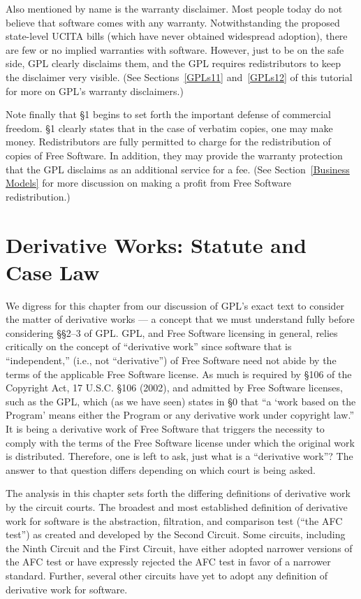 \documentclass[11pt, letterpaper]{book}
\begin{document}
Also mentioned by name is the warranty disclaimer. Most people today do
not believe that software comes with any warranty. Notwithstanding the
proposed state-level UCITA bills (which have never obtained widespread
adoption), there are few or no implied warranties with software.
However, just to be on the safe side, GPL clearly disclaims them, and the
GPL requires redistributors to keep the disclaimer very visible. (See
Sections~\ref{GPLs11} and~\ref{GPLs12} of this tutorial for more on GPL's
warranty disclaimers.)

Note finally that \S 1 begins to set forth the important defense of
commercial freedom. \S 1 clearly states that in the case of verbatim
copies, one may make money. Redistributors are fully permitted to charge
for the redistribution of copies of Free Software. In addition, they may
provide the warranty protection that the GPL disclaims as an additional
service for a fee. (See Section~\ref{Business Models} for more discussion
on making a profit from Free Software redistribution.)


\chapter{Derivative Works: Statute and Case Law}

We digress for this chapter from our discussion of GPL's exact text to
consider the matter of derivative works --- a concept that we must
understand fully before considering \S\S 2--3 of GPL\@. GPL, and Free
Software licensing in general, relies critically on the concept of
``derivative work'' since software that is ``independent,'' (i.e., not
``derivative'') of Free Software need not abide by the terms of the
applicable Free Software license. As much is required by \S 106 of the
Copyright Act, 17 U.S.C. \S 106 (2002), and admitted by Free Software
licenses, such as the GPL, which (as we have seen) states in \S 0 that ``a
`work based on the Program' means either the Program or any derivative
work under copyright law.'' It is being a derivative work of Free Software
that triggers the necessity to comply with the terms of the Free Software
license under which the original work is distributed. Therefore, one is
left to ask, just what is a ``derivative work''? The answer to that
question differs depending on which court is being asked.

The analysis in this chapter sets forth the differing definitions of
derivative work by the circuit courts. The broadest and most
established definition of derivative work for software is the
abstraction, filtration, and comparison test (``the AFC test'') as
created and developed by the Second Circuit. Some circuits, including
the Ninth Circuit and the First Circuit, have either adopted narrower
versions of the AFC test or have expressly rejected the AFC test in
favor of a narrower standard. Further, several other circuits have yet
to adopt any definition of derivative work for software.
\end{document}
